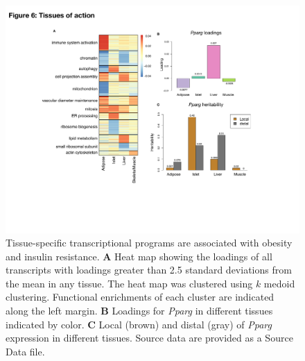 \documentclass[
]{article}
\begin{document}
\begin{figure}[ht!]
\includegraphics[width=\textwidth]{Figures/Fig6_TOA.pdf} 
\caption{Tissue-specific transcriptional programs are 
associated with obesity and insulin resistance. \textbf{A} 
Heat map showing the loadings of all transcripts with 
loadings greater than 2.5 standard deviations from the 
mean in any tissue. The heat map was clustered using 
$k$ medoid clustering. Functional enrichments of each 
cluster are indicated along the left margin. \textbf{B} 
Loadings for \textit{Pparg} in different tissues indicated 
by color. \textbf{C} Local (brown) and distal (gray) of 
\textit{Pparg} expression in different tissues. Source data 
are provided as a Source Data file.
}
\label{fig:toa}
\end{figure}
\end{document}
